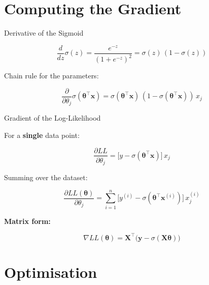 \documentclass[aspectratio=169, professionalfonts]{beamer}
\begin{document}
\section{Computing the Gradient}

\begin{frame}{Derivative of the Sigmoid}

$$\frac{d}{dz}\sigma(z)
  = \frac{e^{-z}}{(1+e^{-z})^2}
  = \sigma(z)\,(1-\sigma(z))$$

\bigskip

Chain rule for the parameters:

$$\frac{\partial}{\partial\theta_j}\sigma(\bm{\theta}^\top\mathbf{x})
  = \sigma(\bm{\theta}^\top\mathbf{x})\,
    (1-\sigma(\bm{\theta}^\top\mathbf{x}))\,x_j$$

\end{frame}

\begin{frame}{Gradient of the Log-Likelihood}

For a \textbf{single} data point:

$$\frac{\partial LL}{\partial\theta_j}
  = \bigl[y - \sigma(\bm{\theta}^\top\mathbf{x})\bigr]\,x_j$$

\bigskip

Summing over the dataset:

$$\frac{\partial LL(\bm{\theta})}{\partial\theta_j}
  = \sum_{i=1}^{n}
    \bigl[y^{(i)} - \sigma(\bm{\theta}^\top\mathbf{x}^{(i)})\bigr]\,x_j^{(i)}$$

\bigskip

\textbf{Matrix form:}

$$\boxed{\nabla LL(\bm{\theta})
  = \mathbf{X}^\top\!\bigl(\mathbf{y} - \sigma(\mathbf{X}\bm{\theta})\bigr)}$$

\end{frame}

\section{Optimisation}
\end{document}
